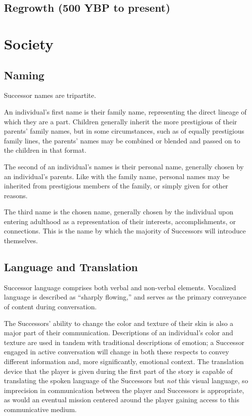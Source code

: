 \documentclass[11pt]{report}
\begin{document}
    \subsection{Regrowth (500 YBP to present)}
    \section{Society}
    \subsection{Naming}
    Successor names are tripartite.
    
    An individual's first name is their family name, representing the direct lineage of which they are a part. Children generally inherit the more prestigious of their parents' family names, but in some circumstances, such as of equally prestigious family lines, the parents' names may be combined or blended and passed on to the children in that format.

    The second of an individual's names is their personal name, generally chosen by an individual's parents. Like with the family name, personal names may be inherited from prestigious members of the family, or simply given for other reasons.

    The third name is the chosen name, generally chosen by the individual upon entering adulthood as a representation of their interests, accomplishments, or connections. This is the name by which the majority of Successors will introduce themselves.

    \subsection{Language and Translation}

    Successor language comprises both verbal and non-verbal elements. Vocalized language is described as ``sharply flowing,'' and serves as the primary conveyance of content during conversation. 

    The Successors' ability to change the color and texture of their skin is also a major part of their communication. Descriptions of an individual's color and texture are used in tandem with traditional descriptions of emotion; a Successor engaged in active conversation will change in both these respects to convey different information and, more significantly, emotional context. The translation device that the player is given during the first part of the story is capable of translating the spoken language of the Successors but \emph{not} this visual language, so imprecision in communication between the player and Successors is appropriate, as would an eventual mission centered around the player gaining access to this communicative medium.
\end{document}
